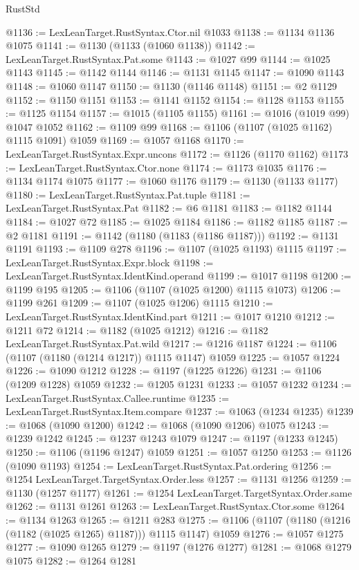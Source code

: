 \begin{lexlean}{RustStd}
\begin{coremodule}
@1136 := LexLeanTarget.RustSyntax.Ctor.nil @1033
@1138 := @1134 @1136 @1075
@1141 := @1130 (@1133 (@1060 @1138))
@1142 := LexLeanTarget.RustSyntax.Pat.some
@1143 := @1027 @99
@1144 := @1025 @1143
@1145 := @1142 @1144
@1146 := @1131 @1145
@1147 := @1090 @1143
@1148 := @1060 @1147
@1150 := @1130 (@1146 @1148)
@1151 := @2 @1129
@1152 := @1150 @1151
@1153 := @1141 @1152
@1154 := @1128 @1153
@1155 := @1125 @1154
@1157 := @1015 (@1105 @1155)
@1161 := @1016 (@1019 @99) @1047 @1052
@1162 := @1109 @99
@1168 := @1106 (@1107 (@1025 @1162) @1115 @1091) @1059
@1169 := @1057 @1168
@1170 := LexLeanTarget.RustSyntax.Expr.uncons
@1172 := @1126 (@1170 @1162)
@1173 := LexLeanTarget.RustSyntax.Ctor.none
@1174 := @1173 @1035
@1176 := @1134 @1174 @1075
@1177 := @1060 @1176
@1179 := @1130 (@1133 @1177)
@1180 := LexLeanTarget.RustSyntax.Pat.tuple
@1181 := LexLeanTarget.RustSyntax.Pat
@1182 := @6 @1181
@1183 := @1182 @1144
@1184 := @1027 @72
@1185 := @1025 @1184
@1186 := @1182 @1185
@1187 := @2 @1181
@1191 := @1142 (@1180 (@1183 (@1186 @1187)))
@1192 := @1131 @1191
@1193 := @1109 @278
@1196 := @1107 (@1025 @1193) @1115
@1197 := LexLeanTarget.RustSyntax.Expr.block
@1198 := LexLeanTarget.RustSyntax.IdentKind.operand
@1199 := @1017 @1198
@1200 := @1199 @195
@1205 := @1106 (@1107 (@1025 @1200) @1115 @1073)
@1206 := @1199 @261
@1209 := @1107 (@1025 @1206) @1115
@1210 := LexLeanTarget.RustSyntax.IdentKind.part
@1211 := @1017 @1210
@1212 := @1211 @72
@1214 := @1182 (@1025 @1212)
@1216 := @1182 LexLeanTarget.RustSyntax.Pat.wild
@1217 := @1216 @1187
@1224 := @1106 (@1107 (@1180 (@1214 @1217)) @1115 @1147) @1059
@1225 := @1057 @1224
@1226 := @1090 @1212
@1228 := @1197 (@1225 @1226)
@1231 := @1106 (@1209 @1228) @1059
@1232 := @1205 @1231
@1233 := @1057 @1232
@1234 := LexLeanTarget.RustSyntax.Callee.runtime
@1235 := LexLeanTarget.RustSyntax.Item.compare
@1237 := @1063 (@1234 @1235)
@1239 := @1068 (@1090 @1200)
@1242 := @1068 (@1090 @1206) @1075
@1243 := @1239 @1242
@1245 := @1237 @1243 @1079
@1247 := @1197 (@1233 @1245)
@1250 := @1106 (@1196 @1247) @1059
@1251 := @1057 @1250
@1253 := @1126 (@1090 @1193)
@1254 := LexLeanTarget.RustSyntax.Pat.ordering
@1256 := @1254 LexLeanTarget.TargetSyntax.Order.less
@1257 := @1131 @1256
@1259 := @1130 (@1257 @1177)
@1261 := @1254 LexLeanTarget.TargetSyntax.Order.same
@1262 := @1131 @1261
@1263 := LexLeanTarget.RustSyntax.Ctor.some
@1264 := @1134 @1263
@1265 := @1211 @283
@1275 := @1106 (@1107 (@1180 (@1216 (@1182 (@1025 @1265) @1187))) @1115 @1147) @1059
@1276 := @1057 @1275
@1277 := @1090 @1265
@1279 := @1197 (@1276 @1277)
@1281 := @1068 @1279 @1075
@1282 := @1264 @1281

\end{coremodule}
\end{lexlean}
